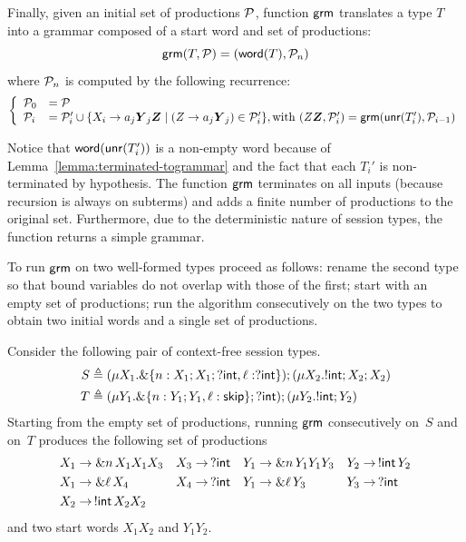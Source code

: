 
Finally, given an initial set of productions $\mathcal P$, function
$\mathsf{grm}$ translates a type $T$ into a grammar composed of a start word
and set of productions:
%
\begin{equation*}
  \mathsf{grm}(T,\mathcal P) = (\mathsf{word}(T), \mathcal P_n)
\end{equation*}
%
where $\mathcal P_n$ is computed by the following recurrence:
\begin{equation*}
  \left\{
    \begin{array}{lll}
      \productions_{0} &= \productions\\
      \productions_i &= \productions_i' \cup \{X_i \rightarrow a_j\vec Y_j \vec Z \mid (Z \rightarrow a_j \vec Y_j)\in \productions_i'\}, \text{with }(Z \vec Z, \productions_i')=\grm(\Unravel(T_i'), \productions_{i-1})
    \end{array}\right.
\end{equation*}

Notice that $\mathsf{word}(\mathsf{unr}(T_i'))$ is a non-empty word because of
Lemma~\ref{lemma:terminated-togrammar} and the fact that each $T_i'$
is non-terminated by hypothesis.  The function $\mathsf{grm}$ terminates on
all inputs (because recursion is always on subterms) and adds a finite
number of productions to the original set. Furthermore, due to the
deterministic nature of session types, the function returns a simple
grammar.

To run $\mathsf{grm}$ on two well-formed types proceed as follows: rename the
second type so that bound variables do not overlap with those of the
first; start with an empty set of productions; run the algorithm
consecutively on the two types to obtain two initial words and a
single set of productions.

\begin{example}
  \label{ex:productions}
  Consider the following pair of context-free session types.
  \begin{align*}
    S & \triangleq (\mu X_1. \&\{n: X_1;X_1;?\mathsf{int}, \ell: ?\mathsf{int}\});(\mu X_2. !\mathsf{int} ; X_2;X_2)\\
    T & \triangleq (\mu Y_1. \&\{n: Y_1;Y_1, \ell: \mathsf{skip}\};?\mathsf{int});(\mu Y_2. !\mathsf{int} ; Y_2)
  \end{align*}
  Starting from the empty set of productions, running $\mathsf{grm}$
  consecutively on~$S$ and on~$T$ produces the following set of
  productions
  \begin{align*}
    X_1 &\rightarrow \& n\, X_1 X_1 X_3 & X_3 &\rightarrow \,? \mathsf{int} &
    Y_1 &\rightarrow \& n\, Y_1 Y_1 Y_3 & Y_2 &\rightarrow \,!\mathsf{int}\, Y_2 
    \\
    X_1 &\rightarrow \& \ell\, X_4           & X_4 &\rightarrow \,? \mathsf{int} &
    Y_1 &\rightarrow \& \ell \,Y_3           & Y_3 &\rightarrow \,? \mathsf{int}
    \\
    X_2 &\rightarrow \,!\mathsf{int}\, X_2 X_2
  \end{align*}
  and two start words $X_1X_2$ and $Y_1Y_2$.
\end{example}

